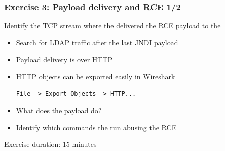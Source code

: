 \begin{frame}[fragile]
    \frametitle{Exercise 3: Payload delivery and RCE 1/2}
	{Identify the TCP stream where the {\color{red}{\bf Attacker}} delivered the RCE payload to the {\color{blue}{\bf Minecraft Server}}}
	\linebreak
    \begin{itemize}
    	\item Search for LDAP traffic after the last JNDI payload
    	\item Payload delivery is over HTTP
    	\item HTTP objects can be exported easily in Wireshark
	\begin{lstlisting}
File -> Export Objects -> HTTP...
	\end{lstlisting}
    	\item What does the payload do?
    	\item Identify which commands the {\color{red}{\bf Attacker}} run abusing the RCE

    \end{itemize}
    \begin{center}Exercise duration: 15 minutes\end{center}
\end{frame}

